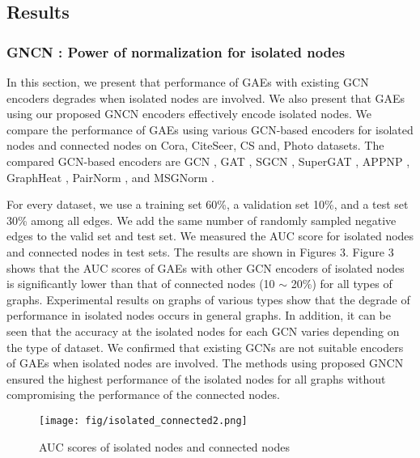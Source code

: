 \documentclass[sigconf]{acmart}
\begin{document}
\subsection{Results}
\subsubsection{GNCN : Power of normalization for isolated nodes}
In this section, we present that performance of GAEs with existing GCN encoders degrades when isolated nodes are involved.
We also present that GAEs using our proposed GNCN encoders effectively encode isolated nodes.
We compare the performance of GAEs using various GCN-based encoders for isolated nodes and connected nodes on Cora, CiteSeer, CS and, Photo datasets.
The compared GCN-based encoders are GCN \cite{kipf2016semi}, GAT \cite{velivckovic2017graph}, SGCN \cite{wu2019simplifying}, SuperGAT \cite{kim2020find}, APPNP \cite{klicpera2018predict}, GraphHeat \cite{xu2020graph}, PairNorm \cite{zhao2019pairnorm}, and MSGNorm \cite{li2020deepergcn}.



For every dataset, we use a training set 60\%, a validation set 10\%, and a test set 30\% among all edges.
We add the same number of randomly sampled negative edges to the valid set and test set.
We measured the AUC score for isolated nodes and connected nodes in test sets.
The results are shown in Figures 3.
Figure 3 shows that the AUC scores of GAEs with other GCN encoders of isolated nodes is significantly lower than that of connected nodes (10 $\sim$ 20\%) for all types of graphs.
Experimental results on graphs of various types show that the degrade of performance in isolated nodes occurs in general graphs.
In addition, it can be seen that the accuracy at the isolated nodes for each GCN varies depending on the type of dataset.
We confirmed that existing GCNs are not suitable encoders of GAEs when isolated nodes are involved.
The methods using proposed GNCN ensured the highest performance of the isolated nodes for all graphs without compromising the performance of the connected nodes.

\begin{figure}[t]
    \centering
    \texttt{[image: fig/isolated\_connected2.png]}
    \caption{AUC scores of isolated nodes and connected nodes}\label{fig:cluster}
\end{figure}
\end{document}
